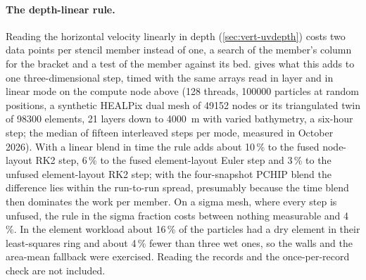
\paragraph{The depth-linear rule.} Reading the horizontal velocity linearly in depth
(\cref{sec:vert-uvdepth}) costs two data points per stencil member instead of one, a search of the member's
column for the bracket and a test of the member against its bed.  gives what
this adds to one three-dimensional step, timed with the same arrays read in layer and in linear mode on
the compute node above (128 threads, \num{100000} particles at random positions, a synthetic HEALPix dual
mesh of \num{49152} nodes or its triangulated twin of \num{98300} elements, 21 layers down to
\SI{4000}{\metre} with varied bathymetry, a six-hour step; the median of fifteen interleaved steps per mode,
measured in October 2026). With a linear blend in time the rule adds about 10\,\% to the fused node-layout
RK2 step, 6\,\% to the fused element-layout Euler step and 3\,\% to the unfused element-layout RK2 step; with
the four-snapshot PCHIP blend the difference lies within the run-to-run spread, presumably because the
time blend then dominates the work per member. On a sigma mesh, where every step is unfused, the rule in the sigma
fraction costs between nothing measurable and 4\,\%. In the element workload about 16\,\% of the particles had
a dry element in their least-squares ring and about 4\,\% fewer than three wet ones, so the walls and the
area-mean fallback were exercised. Reading the records and the once-per-record check are not included.

